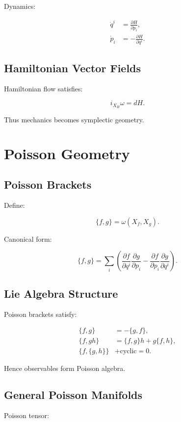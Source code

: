 \documentclass[11pt]{book}
\begin{document}
Dynamics:

\begin{align}
\dot q^i &= \frac{\partial H}{\partial p_i},\\
\dot p_i &= -\frac{\partial H}{\partial q^i}.
\end{align}

\section{Hamiltonian Vector Fields}

Hamiltonian flow satisfies:

\[
i_{X_H}\omega=dH.
\]

Thus mechanics becomes symplectic geometry.

\chapter{Poisson Geometry}

\section{Poisson Brackets}

Define:

\[
\{f,g\}
=
\omega(X_f,X_g).
\]

Canonical form:

\[
\{f,g\}
=
\sum_i
\left(
\frac{\partial f}{\partial q^i}
\frac{\partial g}{\partial p_i}
-
\frac{\partial f}{\partial p_i}
\frac{\partial g}{\partial q^i}
\right).
\]

\section{Lie Algebra Structure}

Poisson brackets satisfy:

\begin{align}
\{f,g\} &=-\{g,f\},\\
\{f,gh\} &= \{f,g\}h+g\{f,h\},\\
\{f,\{g,h\}\} &+ \text{cyclic}=0.
\end{align}

Hence observables form Poisson algebra.

\section{General Poisson Manifolds}

Poisson tensor:
\end{document}
